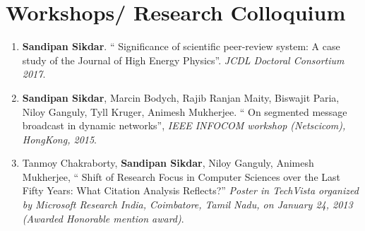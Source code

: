 \section*{Workshops/ Research Colloquium}
\begin{enumerate}

\item {\bf Sandipan Sikdar}. `` Significance of scientific peer-review system: A case study of the Journal of High Energy Physics''. {\em JCDL Doctoral Consortium 2017}.

\item {\bf Sandipan Sikdar}, Marcin Bodych, Rajib Ranjan Maity, Biswajit Paria, Niloy Ganguly, Tyll Kruger, Animesh Mukherjee. `` On segmented message broadcast 
   in dynamic networks'', {\em IEEE INFOCOM workshop (Netscicom), HongKong, 2015}.
   
\item  Tanmoy Chakraborty, {\bf Sandipan Sikdar}, Niloy Ganguly, Animesh Mukherjee, `` Shift of Research Focus in Computer Sciences over the Last Fifty Years: What Citation Analysis Reflects?'' {\em Poster 
in TechVista organized by Microsoft Research India, Coimbatore, Tamil Nadu, on January 24, 2013 (Awarded Honorable mention award)}.   

\end{enumerate}